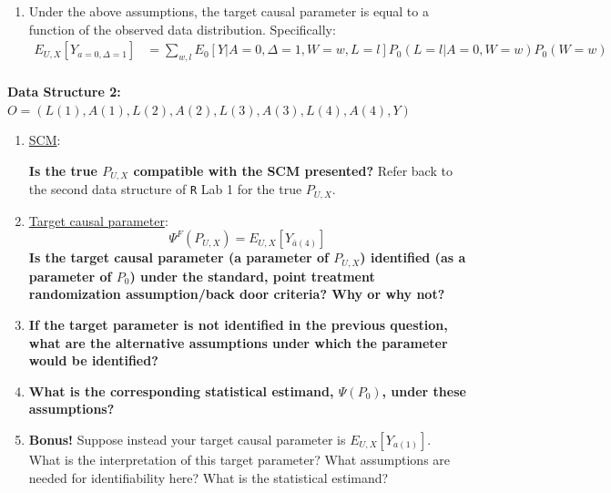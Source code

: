 \documentclass[answers]{exam}
\newenvironment{packed_item}{
\begin{itemize}
 \setlength{\itemsep}{0pt}
  \setlength{\parskip}{0pt}
  \setlength{\parsep}{0pt}
}{\end{itemize}}
\begin{document}
\begin{solution}
\begin{enumerate}
\item Under the above assumptions, the target causal parameter is equal to a function of the observed data distribution. Specifically:
\begin{align*}
E_{U,X}[Y_{a=0, \Delta = 1}] & = \sum_{w, l}E_0[Y|A=0,\Delta=1,W=w,L=l]P_0(L=l|A=0,W=w)P_0(W=w) \\
\end{align*}


\end{enumerate}

\end{solution}

\noindent\large\textbf{Data Structure 2: $O = (L(1), A(1), L(2), A(2), L(3), A(3), L(4), A(4), Y)$}
\normalsize

\begin{enumerate}
\item \underline{SCM}:
\textbf{Is the true $P_{U,X}$ compatible with the SCM presented?} Refer back to the second data structure of \texttt{R} Lab 1 for the true $P_{U,X}$.
\item \underline{Target causal parameter}:
\[
\Psi^F(P_{U,X}) = E_{U,X}[Y_{\bar{a}(4)}]
\]
\textbf{Is the target causal parameter (a parameter of $P_{U,X}$) identified (as a parameter of $P_0$) under the standard, point treatment randomization assumption/back door criteria? Why or why not?}
\item \textbf{If the target parameter is not identified in the previous question, what are the alternative assumptions under which the parameter would be identified?}
\item \textbf{What is the corresponding statistical estimand, $\Psi(P_0)$, under these assumptions?}
\item \textbf{Bonus!} Suppose instead your target causal parameter is $E_{U,X}[Y_{a(1)}]$. What is the interpretation of this target parameter? What assumptions are needed for identifiability here? What is the statistical estimand?
\end{enumerate}
\end{document}
